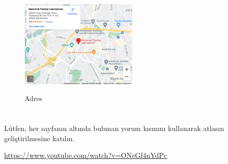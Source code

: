 \documentclass[
  letterpaper,
  DIV=11,
  numbers=noendperiod]{scrreprt}
\begin{document}
\begin{figure}

{\centering 

\href{https://www.google.com/maps/embed?pb=!1m14!1m8!1m3!1d12033.28963318435!2d28.9735333!3d41.0619447!3m2!1i1024!2i768!4f13.1!3m3!1m2!1s0x0\%3A0x5b15447cefe51a4e!2sMemorial\%20Patoloji\%20Laboratuvar\%C4\%B1!5e0!3m2!1sen!2str!4v1646745650518!5m2!1sen!2str}{\includegraphics[width=0.5\textwidth,height=\textheight]{./screenshots/thumbnail_katki.png}}

}

\caption{Adres}

\end{figure}

\hypertarget{section-1}{%
\chapter{}\label{section-1}}

Lütfen, her sayfanın altında bulunan yorum kısmını kullanarak atlasın
geliştirilmesine katılın.

\url{https://www.youtube.com/watch?v=ONeGf4nYdPc}



\printindex
\end{document}
